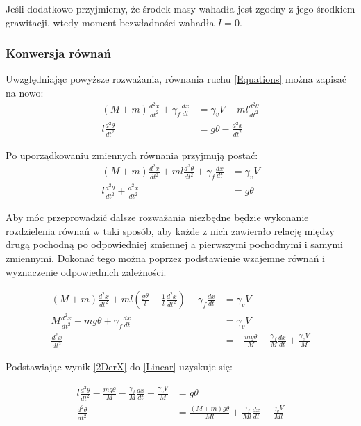 \documentclass[12pt, oneside]{report}
\theoremstyle{definition}
\begin{document}
Jeśli dodatkowo przyjmiemy, że środek masy wahadła jest zgodny z jego środkiem grawitacji, wtedy moment bezwładności wahadła $I = 0$.

\subsubsection{Konwersja równań}
Uwzględniając powyższe rozważania, równania ruchu \ref{Equations} można zapisać na nowo:
\begin{equation}
\begin{aligned}
(M + m) \frac{d^2x}{dt^2} + \gamma_f \frac{dx}{dt} &= \gamma_v V - ml \frac{d^2\theta}{dt^2}\\
l \frac{d^2\theta}{dt^2} &= g\theta - \frac{d^2x}{dt^2}
\end{aligned}
\end{equation}

Po uporządkowaniu zmiennych równania przyjmują postać:
\begin{equation} \label{Linear}
\begin{aligned}
(M + m) \frac{d^2x}{dt^2} + ml \frac{d^2\theta}{dt^2} +  \gamma_f \frac{dx}{dt} &= \gamma_v V\\
l \frac{d^2\theta}{dt^2} + \frac{d^2x}{dt^2} &= g\theta
\end{aligned}
\end{equation}

Aby móc przeprowadzić dalsze rozważania niezbędne będzie wykonanie rozdzielenia równań w taki sposób, aby każde z nich zawierało relację między drugą pochodną po odpowiedniej zmiennej a pierwszymi pochodnymi i samymi zmiennymi. Dokonać tego można poprzez podstawienie wzajemne równań i wyznaczenie odpowiednich zależności.

\begin{equation} \label{2DerX}
\begin{aligned}
(M + m) \frac{d^2x}{dt^2} + ml (\frac{g\theta}{l} - \frac{1}{l} \frac{d^2x}{dt^2}) +  \gamma_f \frac{dx}{dt} &= \gamma_v V\\
M \frac{d^2x}{dt^2} + mg \theta + \gamma_f \frac{dx}{dt} &= \gamma_v V\\
\frac{d^2x}{dt^2} &= -\frac{mg \theta}{M} - \frac{\gamma_f}{M} \frac{dx}{dt} + \frac{\gamma_v V}{M}
\end{aligned}
\end{equation}

Podstawiając wynik \ref{2DerX} do \ref{Linear} uzyskuje się:

\begin{equation}
\begin{aligned}
l \frac{d^2\theta}{dt^2} -\frac{mg \theta}{M} - \frac{\gamma_f}{M} \frac{dx}{dt} + \frac{\gamma_v V}{M} &= g\theta\\
\frac{d^2\theta}{dt^2} &= \frac{(M+m)g\theta}{Ml} + \frac{\gamma_f}{Ml}\frac{dx}{dt} - \frac{\gamma_vV}{Ml}
\end{aligned}
\end{equation}
\end{document}
